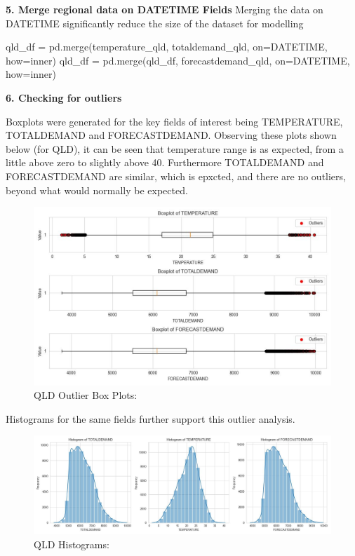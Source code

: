 \documentclass[
]{article}
\newenvironment{Shaded}{}{}
\newcommand{\NormalTok}[1]{#1}
\newcommand{\OperatorTok}[1]{\textcolor[rgb]{0.40,0.40,0.40}{#1}}
\newcommand{\StringTok}[1]{\textcolor[rgb]{0.25,0.44,0.63}{#1}}
\begin{document}
\textbf{5. Merge regional data on DATETIME Fields} Merging the data on
DATETIME significantly reduce the size of the dataset for modelling

\begin{Shaded}
\begin{Highlighting}[]
\NormalTok{qld\_df }\OperatorTok{=}\NormalTok{ pd.merge(temperature\_qld, totaldemand\_qld, on}\OperatorTok{=}\StringTok{\textquotesingle{}DATETIME\textquotesingle{}}\NormalTok{, how}\OperatorTok{=}\StringTok{\textquotesingle{}inner\textquotesingle{}}\NormalTok{)}
\NormalTok{qld\_df }\OperatorTok{=}\NormalTok{ pd.merge(qld\_df, forecastdemand\_qld, on}\OperatorTok{=}\StringTok{\textquotesingle{}DATETIME\textquotesingle{}}\NormalTok{, how}\OperatorTok{=}\StringTok{\textquotesingle{}inner\textquotesingle{}}\NormalTok{)}
\end{Highlighting}
\end{Shaded}

\textbf{6. Checking for outliers}

Boxplots were generated for the key fields of interest being
TEMPERATURE, TOTALDEMAND and FORECASTDEMAND. Observing these plots shown
below (for QLD), it can be seen that temperature range is as expected,
from a little above zero to slightly above 40. Furthermore TOTALDEMAND
and FORECASTDEMAND are similar, which is epxcted, and there are no
outliers, beyond what would normally be expected.

\begin{figure}
\centering
\includegraphics{img/OutlierBoxPlots.jpg}
\caption{QLD Outlier Box Plots:}
\end{figure}

Histograms for the same fields further support this outlier analysis.

\begin{figure}
\centering
\includegraphics{img/Histogram.jpg}
\caption{QLD Histograms:}
\end{figure}
\end{document}
